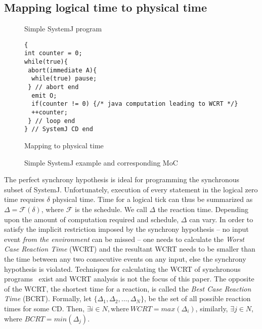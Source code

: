 \subsection{Mapping logical time to physical time}
\label{sec:mapping-logical-time}

\begin{figure}[t!]
\centering
\begin{SubFloat}{\label{fig:2a}Simple SystemJ program}%
\begin{minipage}[b]{1\linewidth}%
		\begin{lstlisting}[style=sysj,morekeywords={abort,await,emit,present,trap,pause,exit,delay,suspend}]
{
int counter = 0;
while(true){
 abort(immediate A){
  while(true) pause; 
 } // abort end
  emit O;
  if(counter != 0) {/* java computation leading to WCRT */}
  ++counter;
 } // loop end
} // SystemJ CD end
\end{lstlisting}%
\end{minipage}%
\end{SubFloat}

\begin{SubFloat}{\label{fig:2c}Mapping to physical time}%
\scalebox{0.68}{}
\end{SubFloat}%
\caption{Simple SystemJ example and corresponding MoC}
\label{fig:2}
\end{figure}

The perfect synchrony hypothesis is ideal for programming the
synchronous subset of SystemJ. Unfortunately, execution of every
statement in the logical zero time requires $\delta$ physical time. Time
for a logical tick can thus be summarized as $\Delta = \mathcal{F}
(\delta)$, where $\mathcal{F}$ is the schedule. We call $\Delta$ the
reaction time. Depending upon the amount of computation required and
schedule, $\Delta$ can vary. In order to satisfy the implicit
restriction imposed by the synchrony hypothesis -- no input event
\textit{from the environment} can be missed -- one needs to calculate
the \textit{Worst Case Reaction Time} (WCRT) and the resultant WCRT
needs to be smaller than the time between any two consecutive events on
any input, else the synchrony hypothesis is violated. Techniques for
calculating the WCRT of synchronous programs~\cite{boldt07} exist and
WCRT analysis is not the focus of this paper. The opposite of the WCRT,
the shortest time for a reaction, is called the \textit{Best Case
  Reaction Time} (BCRT). Formally, let $\{\Delta_1, \Delta_2,\ldots,
\Delta_N\}$, be the set of all possible reaction times for some
CD. Then, $\exists i \in N, \mathrm{where\ } WCRT= max (\Delta_i)$,
similarly, $\exists j \in N$, where $BCRT = min (\Delta_j)$.


